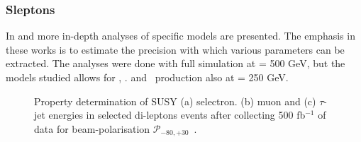 \subsubsection{Sleptons}
\label{subsec:searches_sleptons}
In \cite{Berggren:2015qua} and \cite{Bechtle:2009em}
more in-depth analyses of specific models are presented.
The emphasis in these works is to estimate the precision
with which various parameters can be extracted.
The analyses were done with full simulation at \Ecms = 500 GeV,
but the models studied allows for \selr, \smur. and \stone~production also
at \Ecms = 250 GeV.
\begin{figure}[]
  \begin{center}
    \hspace{0.01\linewidth}
    \hspace{0.01\linewidth}
  \end{center}
  \caption{\label{fig:searches_sleptons} Property determination of SUSY  (a) selectron.  (b) muon and 
(c) $\tau$-jet energies in selected di-leptons events
after collecting
500 fb$^{-1}$ of data for beam-polarisation  $\mathcal{P}_{-80,+30}$~\cite{Berggren:2015qua}. }
\end{figure}
